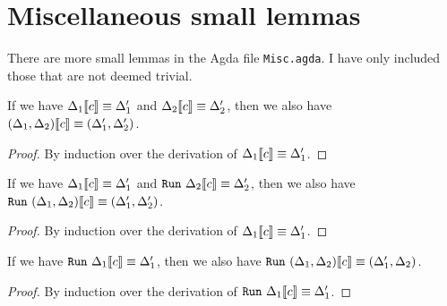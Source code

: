 \section{Miscellaneous small lemmas}

There are more small lemmas in the Agda file \texttt{Misc.agda}. I have only
included those that are not deemed trivial.

\begin{lemma}
  If we have ${\Delta_1} \llbracket {c} \rrbracket \equiv {\Delta_1'}$ and
  ${\Delta_2} \llbracket {c} \rrbracket \equiv {\Delta_2'}$, then we also have
  ${(\Delta_1,\Delta_2)} \llbracket {c} \rrbracket \equiv {(\Delta_1',\Delta_2')}$.
\end{lemma}
\begin{proof}
  By induction over the derivation of ${\Delta_1} \llbracket {c} \rrbracket \equiv {\Delta_1'}$.
\end{proof}

\begin{lemma}
  If we have ${\Delta_1} \llbracket {c} \rrbracket \equiv {\Delta_1'}$ and
  $\mathtt{Run}\ {\Delta_2} \llbracket {c} \rrbracket \equiv {\Delta_2'}$, then we also have
  $\mathtt{Run}\ {(\Delta_1,\Delta_2)} \llbracket {c} \rrbracket \equiv {(\Delta_1',\Delta_2')}$.
\end{lemma}
\begin{proof}
  By induction over the derivation of ${\Delta_1} \llbracket {c} \rrbracket \equiv {\Delta_1'}$.
\end{proof}

\begin{lemma}
  If we have $\mathtt{Run}\ {\Delta_1} \llbracket {c} \rrbracket \equiv {\Delta_1'}$, then we also have
  $\mathtt{Run}\ {(\Delta_1,\Delta_2)} \llbracket {c} \rrbracket \equiv {(\Delta_1',\Delta_2)}$.
\end{lemma}
\begin{proof}
  By induction over the derivation of $\mathtt{Run}\ {\Delta_1} \llbracket {c} \rrbracket \equiv {\Delta_1'}$.
\end{proof}
